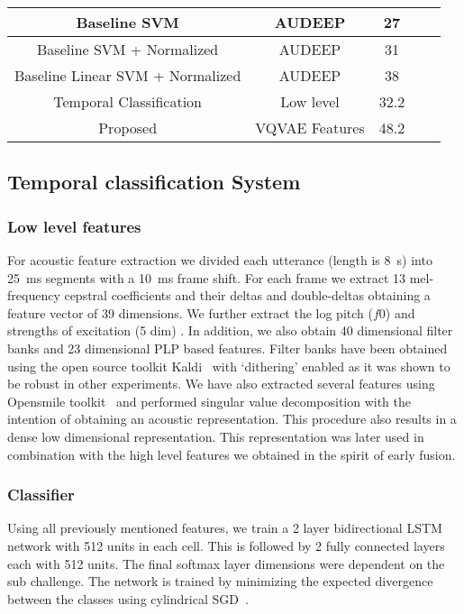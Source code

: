 \begin{table*}[h]
\begin{tabular}{|c|c|c|c|c|}
Baseline SVM & AUDEEP & 27 & & \\
\hline
Baseline SVM + Normalized & AUDEEP & 31 & & \\
\hline

Baseline Linear SVM + Normalized & AUDEEP & 38 & & \\
\hline

Temporal Classification  & Low level & 32.2 & & \\
\hline

Proposed  & VQVAE Features & 48.2 & & \\
\hline
\end{tabular}
\label{table_systems}
\end{table*}

\fi

\subsection{Temporal classification System}


\subsubsection{Low level features}

For acoustic feature extraction we divided each utterance (length is \SI{8}{\second}) into \SI{25}{\milli\second} segments with a \SI{10}{\milli\second} frame shift. For each frame we extract 13 mel-frequency cepstral coefficients and their deltas and double-deltas obtaining a feature vector of 39 dimensions. We further extract the log pitch ($f0$) and strengths of excitation (5 dim) \cite{yoshimura2001mixed}. In addition, we also obtain 40 dimensional filter banks and 23 dimensional PLP based features. Filter banks have been obtained using the open source toolkit Kaldi~\cite{kaldi2011} with `dithering' enabled as it was shown to be robust in other experiments. We have also extracted several features using Opensmile toolkit~\cite{opensmile2010} and performed singular value decomposition with the intention of obtaining an acoustic representation. This procedure also results in a dense low dimensional representation.  This representation was later used  in combination with the high level features we obtained in the spirit of early fusion. 

\subsubsection{Classifier}
Using all previously mentioned features, we train a 2 layer bidirectional LSTM network with 512 units in each cell. This is followed by 2 fully connected layers each with 512 units. The final softmax layer dimensions were dependent on the sub challenge. The network is trained by minimizing the expected divergence between the classes using cylindrical SGD~\cite{smith2017cyclical}. 


